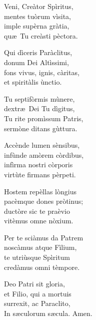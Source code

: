 
\strofa Veni, Creàtor Spìritus,\\
mentes tuòrum vìsita,\\
imple supèrna gràtia,\\
qu\ae\ Tu creàsti pèctora.

\spazio

\strofa Qui dìceris Paràclitus,\\
donum Dei Altìssimi,\\
fons vivus, ignis, càritas,\\
et spiritàlis ùnctio.

\spazio

\strofa Tu septifòrmis mùnere,\\
dextr\ae\ Dei Tu dìgitus,\\
Tu rite promìssum Patris,\\
sermòne ditans gùttura.

\spazio

\strofa Accènde lumen sènsibus,\\
infùnde amòrem còrdibus,\\
infìrma nostri còrporis\\
virtùte firmans pèrpeti.

\spazio

\strofa Hostem repèllas lòngius\\
pacèmque dones pròtinus;\\
ductòre sic te praèvio\\
vitèmus omne nòxium.

\spazio

\strofa Per te sciàmus da Patrem\\
noscàmus atque Fìlium,\\
te utriùsque Spìritum\\
credàmus omni tèmpore.

\spazio

\strofa Deo Patri sit gloria,\\
et Filio, qui a mortuis\\
surrexit, ac Paraclito,\\
In s\ae culorum s\ae cula. Amen.
